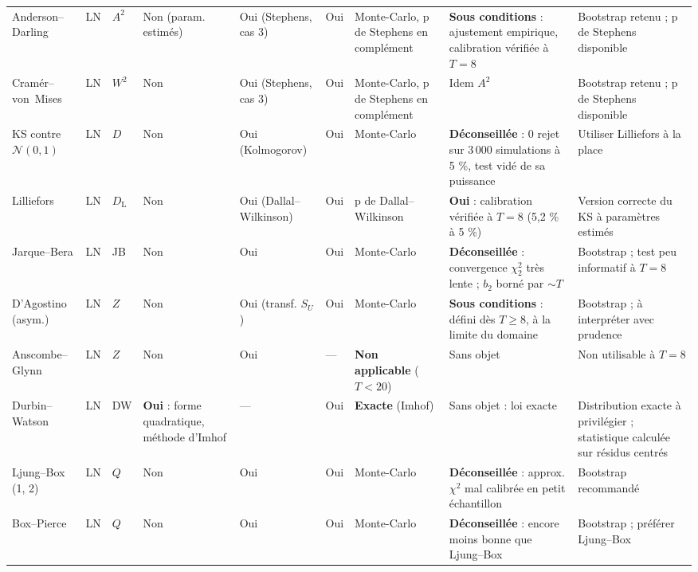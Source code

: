 \documentclass[a4paper,11pt]{article}
\begin{document}
\begin{landscape}
\begin{center}
\begin{longtable}{@{}p{2.9cm}p{1.5cm}p{1.1cm}p{1.3cm}p{1.3cm}p{1.3cm}p{2.7cm}p{4.7cm}p{4.1cm}@{}}
Anderson--Darling & LN & $A^2$ & Non (param. estimés) & Oui (Stephens, cas 3) & Oui &
Monte-Carlo, p de Stephens en complément &
\textbf{Sous conditions} : ajustement empirique, calibration vérifiée à $T=8$ &
Bootstrap retenu ; p de Stephens disponible \\

Cramér--von~Mises & LN & $W^2$ & Non & Oui (Stephens, cas 3) & Oui &
Monte-Carlo, p de Stephens en complément & Idem $A^2$ &
Bootstrap retenu ; p de Stephens disponible \\

KS contre $\mathcal{N}(0,1)$ & LN & $D$ & Non & Oui (Kolmogorov) & Oui & Monte-Carlo &
\textbf{Déconseillée} : 0 rejet sur 3\,000 simulations à 5 \%, test vidé de sa puissance &
Utiliser Lilliefors à la place \\

Lilliefors & LN & $D_{\mathrm{L}}$ & Non & Oui (Dallal--Wilkinson) & Oui &
p de Dallal--Wilkinson & \textbf{Oui} : calibration vérifiée à $T=8$ (5,2 \% à 5 \%) &
Version correcte du KS à paramètres estimés \\

Jarque--Bera & LN & JB & Non & Oui & Oui & Monte-Carlo &
\textbf{Déconseillée} : convergence $\chi^2_2$ très lente ; $b_2$ borné par
$\sim T$ & Bootstrap ; test peu informatif à $T=8$ \\

D'Agostino (asym.) & LN & $Z$ & Non & Oui (transf. $S_U$) & Oui & Monte-Carlo &
\textbf{Sous conditions} : défini dès $T\ge 8$, à la limite du domaine &
Bootstrap ; à interpréter avec prudence \\

Anscombe--Glynn & LN & $Z$ & Non & Oui & --- & \textbf{Non applicable} ($T<20$) &
Sans objet & Non utilisable à $T=8$ \\

Durbin--Watson & LN & DW & \textbf{Oui} : forme quadratique, méthode d'Imhof & --- & Oui &
\textbf{Exacte} (Imhof) & Sans objet : loi exacte &
Distribution exacte à privilégier ; statistique calculée sur résidus centrés \\

Ljung--Box (1, 2) & LN & $Q$ & Non & Oui & Oui & Monte-Carlo &
\textbf{Déconseillée} : approx. $\chi^2$ mal calibrée en petit échantillon &
Bootstrap recommandé \\

Box--Pierce & LN & $Q$ & Non & Oui & Oui & Monte-Carlo &
\textbf{Déconseillée} : encore moins bonne que Ljung--Box &
Bootstrap ; préférer Ljung--Box \\


\end{longtable}
\end{center}
\end{landscape}
\end{document}
